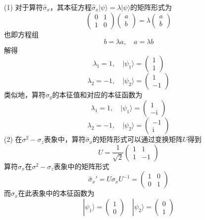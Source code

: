 \begin{solution}
    (1) 对于算符$\hat{\sigma}_x$，其本征方程$\hat{\sigma}_x|\psi\rangle = \lambda|\psi\rangle$的矩阵形式为
    $$
        \begin{pmatrix}
            0 & 1 \\
            1 & 0
        \end{pmatrix}\begin{pmatrix}
            a \\
            b
        \end{pmatrix}
        =\lambda\begin{pmatrix}
            a \\
            b
        \end{pmatrix}
    $$
    也即方程组
    $$
        b = \lambda a, \quad
        a =\lambda b
    $$
    解得
    $$
        \lambda_1=1, \quad |\psi_1\rangle=\begin{pmatrix}
            1 \\ 1
        \end{pmatrix}
    $$
    $$
        \lambda_2=-1, \quad |\psi_2\rangle=\begin{pmatrix}
            1 \\ -1
        \end{pmatrix}
    $$
    类似地，算符$\hat{\sigma}_y$的本征值和对应的本征函数为
    $$
        \lambda_1=1, \quad |\psi_1\rangle=\begin{pmatrix}
            1 \\ -\mathrm{i}
        \end{pmatrix}
    $$
    $$
        \lambda_2=-1, \quad |\psi_2\rangle=\begin{pmatrix}
            -1 \\ \mathrm{i}
        \end{pmatrix}
    $$
    (2) 在$\sigma^2-\sigma_z$表象中，算符$\hat{\sigma}_x$的矩阵形式可以通过变换矩阵$U$得到
    $$
        U=\frac{1}{\sqrt{2}}\begin{pmatrix}
            1 & 1  \\
            1 & -1
        \end{pmatrix}
    $$
    算符$\hat{\sigma}_x$在$\sigma^2-\sigma_z$表象中的矩阵形式
    $$
        \hat{\sigma}_x' = U\sigma_xU^{-1} = \begin{pmatrix}
            1 & 0 \\
            0 & 1
        \end{pmatrix}
    $$
    而$\hat{\sigma}_x$在此表象中的本征函数为
    $$
        |\psi_1\rangle=\begin{pmatrix}
            1 \\
            0
        \end{pmatrix}
        \quad
        |\psi_2\rangle=\begin{pmatrix}
            0 \\
            1
        \end{pmatrix}
    $$
\end{solution}











